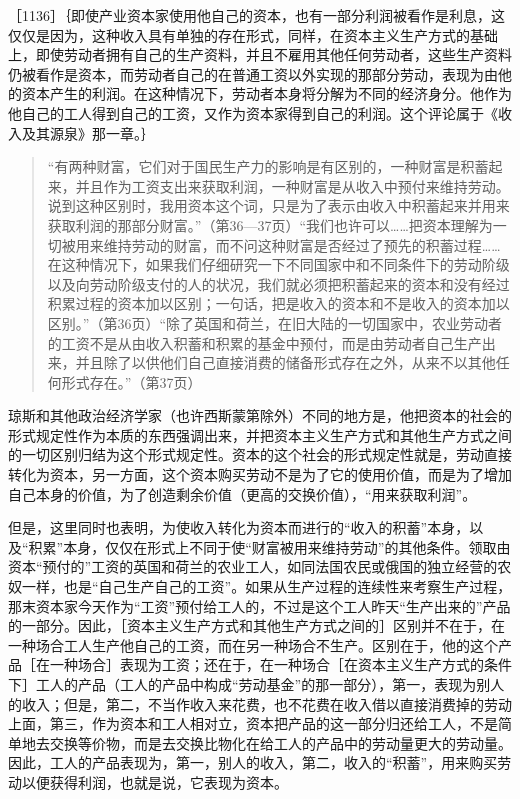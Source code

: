 ［1136］｛即使产业资本家使用他自己的资本，也有一部分利润被看作是利息，这仅仅是因为，这种收入具有单独的存在形式，同样，在资本主义生产方式的基础上，即使劳动者拥有自己的生产资料，并且不雇用其他任何劳动者，这些生产资料仍被看作是资本，而劳动者自己的在普通工资以外实现的那部分劳动，表现为由他的资本产生的利润。在这种情况下，劳动者本身将分解为不同的经济身分。他作为他自己的工人得到自己的工资，又作为资本家得到自己的利润。这个评论属于《收入及其源泉》那一章。｝

\begin{quote}{“有两种财富，它们对于国民生产力的影响是有区别的，一种财富是积蓄起来，并且作为工资支出来获取利润，一种财富是从收入中预付来维持劳动。说到这种区别时，我用资本这个词，只是为了表示由收入中积蓄起来并用来获取利润的那部分财富。”（第36—37页）“我们也许可以……把资本理解为一切被用来维持劳动的财富，而不问这种财富是否经过了预先的积蓄过程……在这种情况下，如果我们仔细研究一下不同国家中和不同条件下的劳动阶级以及向劳动阶级支付的人的状况，我们就必须把积蓄起来的资本和没有经过积累过程的资本加以区别；一句话，把是收入的资本和不是收入的资本加以区别。”（第36页）“除了英国和荷兰，在旧大陆的一切国家中，农业劳动者的工资不是从由收入积蓄和积累的基金中预付，而是由劳动者自己生产出来，并且除了以供他们自己直接消费的储备形式存在之外，从来不以其他任何形式存在。”（第37页）}\end{quote}

琼斯和其他政治经济学家（也许西斯蒙第除外）不同的地方是，他把资本的社会的形式规定性作为本质的东西强调出来，并把资本主义生产方式和其他生产方式之间的一切区别归结为这个形式规定性。资本的这个社会的形式规定性就是，劳动直接转化为资本，另一方面，这个资本购买劳动不是为了它的使用价值，而是为了增加自己本身的价值，为了创造剩余价值（更高的交换价值），“用来获取利润”。

但是，这里同时也表明，为使收入转化为资本而进行的“收入的积蓄”本身，以及“积累”本身，仅仅在形式上不同于使“财富被用来维持劳动”的其他条件。领取由资本“预付的”工资的英国和荷兰的农业工人，如同法国农民或俄国的独立经营的农奴一样，也是“自己生产自己的工资”。如果从生产过程的连续性来考察生产过程，那末资本家今天作为“工资”预付给工人的，不过是这个工人昨天“生产出来的”产品的一部分。因此，［资本主义生产方式和其他生产方式之间的］区别并不在于，在一种场合工人生产他自己的工资，而在另一种场合不生产。区别在于，他的这个产品［在一种场合］表现为工资；还在于，在一种场合［在资本主义生产方式的条件下］工人的产品（工人的产品中构成“劳动基金”的那一部分），第一，表现为别人的收入；但是，第二，不当作收入来花费，也不花费在收入借以直接消费掉的劳动上面，第三，作为资本和工人相对立，资本把产品的这一部分归还给工人，不是简单地去交换等价物，而是去交换比物化在给工人的产品中的劳动量更大的劳动量。因此，工人的产品表现为，第一，别人的收入，第二，收入的“积蓄”，用来购买劳动以便获得利润，也就是说，它表现为资本。

